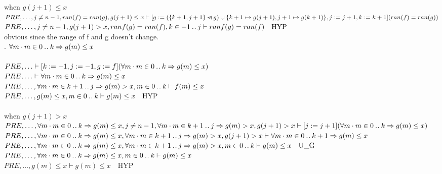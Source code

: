 \documentclass[11pt,a4paper,fleqn]{article}
\begin{document}
\noindent
when $g(j+1) \le x$\\
$PRE,\ldots,j \not= n-1,ran(f)=ran(g),g(j+1) \le x  \vdash [g :=(\{k+1, j+1\} \mathbin{\lhd\mkern-14mu-} g) \cup\{k+1 \mapsto g(j+1), j+1 \mapsto g(k+1)\},j:=j+1,k:=k+1](ran(f)=ran(g)) $\\
$PRE,\ldots,j \not= n-1,g(j+1)>x,ranf(g) = ran(f),k \in -1 \mathbin{.\mkern1mu.} j  \vdash ranf(g) = ran(f) \quad \text{HYP}$\\
obvious since the range of f and g doesn't change. \\

. $\forall m \cdot m \in 0 \mathbin{.\mkern1mu.} k \Rightarrow g(m) \le x$\\
\\
$PRE,\ldots \vdash [k:=-1,j:=-1,g:=f](\forall m \cdot m \in 0 \mathbin{.\mkern1mu.} k \Rightarrow g(m) \le x)$\\
$PRE,\ldots \vdash \forall m \cdot m \in 0 \mathbin{.\mkern1mu.} k \Rightarrow g(m) \le x$\\
$PRE,\ldots,\forall m \cdot m \in k+1 \mathbin{.\mkern1mu.} j \Rightarrow g(m)>x,m \in 0 \mathbin{.\mkern1mu.} k \vdash    f(m) \le x $\\
$PRE,\ldots,g(m) \le x,m \in 0 \mathbin{.\mkern1mu.} k \vdash    g(m) \le x \quad \text{HYP}$\\

\noindent
{}\\
when $g(j+1)>x$\\
$PRE,\ldots,\forall m \cdot m \in 0 \mathbin{.\mkern1mu.} k \Rightarrow g(m) \le x,j \not= n-1,\forall m \cdot m \in k+1 \mathbin{.\mkern1mu.} j \Rightarrow g(m)>x,g(j+1)>x  \vdash [j:=j+1](\forall m \cdot m \in 0 \mathbin{.\mkern1mu.} k \Rightarrow g(m) \le x) $\\
$PRE,\ldots,\forall m \cdot m \in 0 \mathbin{.\mkern1mu.} k \Rightarrow g(m) \le x,\forall m \cdot m \in k+1 \mathbin{.\mkern1mu.} j \Rightarrow g(m)>x,g(j+1)>x  \vdash \forall m \cdot m \in 0 \mathbin{.\mkern1mu.} k+1 \Rightarrow g(m) \le x  $\\
$PRE,\ldots,\forall m \cdot m \in 0 \mathbin{.\mkern1mu.} k \Rightarrow g(m) \le x,\forall m \cdot m \in k+1 \mathbin{.\mkern1mu.} j \Rightarrow g(m)>x,m \in 0 \mathbin{.\mkern1mu.} k  \vdash  g(m) \le x  \quad \text{U}\_\text{G}$\\
$PRE,\ldots,\forall m \cdot m \in 0 \mathbin{.\mkern1mu.} k \Rightarrow g(m) \le x,m \in 0 \mathbin{.\mkern1mu.} k  \vdash  g(m) \le x $\\
$PRE,\ldots,g(m) \le x  \vdash  g(m) \le x  \quad \text{HYP}$\\
\end{document}
